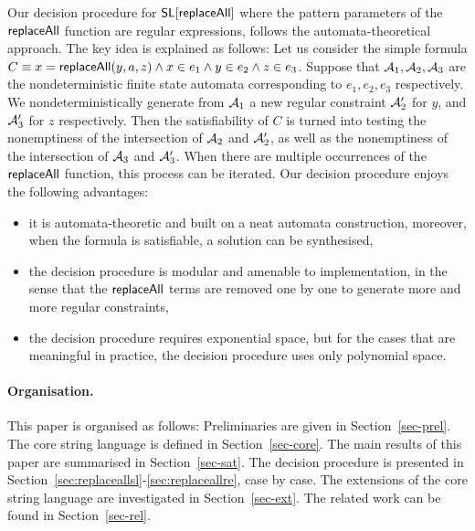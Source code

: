 Our decision procedure for $\mathsf{SL}[\mathsf{replaceAll}]$ where the pattern parameters of the $\mathsf{replaceAll}$ function are regular expressions, follows the automata-theoretical approach. The key idea is explained as follows: Let us consider the simple formula $C \equiv x = \mathsf{replaceAll}(y, a, z) \wedge x \in e_1 \wedge y \in e_2 \wedge z \in e_3$. 
Suppose that $\mathcal{A}_1,\mathcal{A}_2,\mathcal{A}_3$ are the nondeterministic finite state automata corresponding to $e_1,e_2,e_3$ respectively. 
We nondeterministically generate from $\mathcal{A}_1$ a new regular constraint $\mathcal{A}'_2$ for $y$, and $\mathcal{A}'_3$ for $z$ respectively. Then the satisfiability of $C$ is turned into testing the nonemptiness of the intersection of $\mathcal{A}_2$ and $\mathcal{A}'_2$, as well as the nonemptiness of the intersection of $\mathcal{A}_3$ and $\mathcal{A}'_3$. When there are multiple occurrences of the $\mathsf{replaceAll}$ function, this process can be iterated. 
Our decision procedure enjoys the following advantages:
\begin{itemize}
	\item it is automata-theoretic and built on a neat automata construction, moreover, when the formula is satisfiable, a solution can be synthesised, 
	
	\item the decision procedure is modular and amenable to implementation,  in the sense that the $\mathsf{replaceAll}$ terms are removed one by one to generate more and more regular constraints,
	
	\item the decision procedure requires exponential space, but for the cases that are meaningful in practice, the decision procedure uses only polynomial space. 
\end{itemize}

%


\paragraph{Organisation.} 
This paper is organised as follows: Preliminaries are given in Section~\ref{sec-prel}. The core string language is defined in Section~\ref{sec-core}. The main results of this paper are summarised in Section~\ref{sec-sat}. The decision procedure is presented in Section~\ref{sec:replaceallsl}-\ref{sec:replaceallre}, case by case. The extensions of the core string language are investigated in Section~\ref{sec-ext}. The related work can be found in Section~\ref{sec-rel}.
